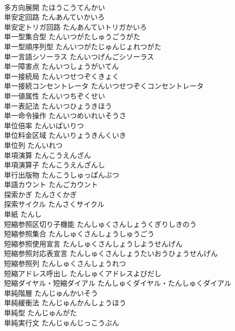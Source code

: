 \documentclass[8pt]{extreport}
\begin{document}
\begin{CJK}{UTF8}{min}
\\	多方向展開	たほうこうてんかい	
\\	単安定回路	たんあんていかいろ	
\\	単安定トリガ回路	たんあんていトリガかいろ	
\\	単一型集合型	たんいつがたしゅうごうがた	
\\	単一型順序列型	たんいつがたじゅんじょれつがた	
\\	単一言語シソーラス	たんいつげんごシソーラス	
\\	単一障害点	たんいつしょうがいてん	
\\	単一接続局	たんいつせつぞくきょく	
\\	単一接続コンセントレータ	たんいつせつぞくコンセントレータ	
\\	単一値属性	たんいつちぞくせい	
\\	単一表記法	たんいつひょうきほう	
\\	単一命令操作	たんいつめいれいそうさ	
\\	単位倍率	たんいばいりつ	
\\	単位料金区域	たんいりょうきんくいき	
\\	単位列	たんいれつ	
\\	単項演算	たんこうえんざん	
\\	単項演算子	たんこうえんざんし	
\\	単行出版物	たんこうしゅっぱんぶつ	
\\	単語カウント	たんごカウント	
\\	探索かぎ	たんさくかぎ	
\\	探索サイクル	たんさくサイクル	
\\	単紙	たんし	
\\	短縮参照区切り子機能	たんしゅくさんしょうくぎりしきのう	
\\	短縮参照集合	たんしゅくさんしょうしゅうごう	
\\	短縮参照使用宣言	たんしゅくさんしょうしようせんげん	
\\	短縮参照対応表宣言	たんしゅくさんしょうたいおうひょうせんげん	
\\	短縮参照列	たんしゅくさんしょうれつ	
\\	短縮アドレス呼出し	たんしゅくアドレスよびだし	
\\	短縮ダイヤル・短縮ダイアル	たんしゅくダイヤル・たんしゅくダイアル	
\\	単純階層	たんじゅんかいそう	
\\	単純緩衝法	たんじゅんかんしょうほう	
\\	単純型	たんじゅんがた	
\\	単純実行文	たんじゅんじっこうぶん	

\end{CJK}
\end{document}
